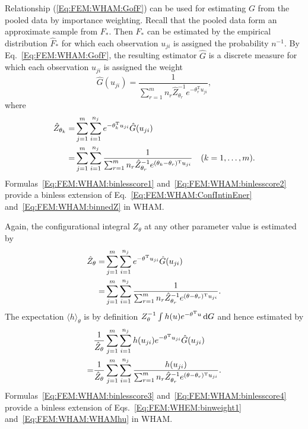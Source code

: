Relationship (\ref{Eq:FEM:WHAM:GofF}) can be used for estimating $G$ from the pooled data by importance weighting. Recall that the pooled data form an approximate sample from $F_\ast$. Then $F_\ast$ can be estimated by the empirical distribution $\hat{F}_\ast$ for which each observation $u_{ji}$ is assigned the probability $n^{-1}$. By Eq.~\ref{Eq:FEM:WHAM:GofF}, the resulting estimator $\hat{G}$ is a discrete measure for which each observation $u_{ji}$ is assigned the weight
\begin{equation}
    \hat{G}(u_{ji})=\frac{1}{\sum_{r=1}^m n_r\hat{Z}_{\theta_r}^{-1}e^{-\theta_r^\mathrm{T}u_{ji}}},
    \label{Eq:FEM:WHAM:binlesscore1}
\end{equation}
where
\begin{align}
   \hat{Z}_{\theta_k}=&\sum_{j=1}^m \sum_{i=1}^{n_j}e^{-\theta_k^{\mathrm{T}}u_{ji}}\hat{G}(u_{ji})\notag\\
                     =&\sum_{j=1}^m \sum_{i=1}^{n_j}\frac{1}{\sum_{r=1}^m n_r\hat{Z}_{\theta_r}^{-1}e^{(\theta_k-\theta_r)^{\mathrm{T}}u_{ji}}}\quad (k=1,\dots,m).
   \label{Eq:FEM:WHAM:binlesscore2}
\end{align}
Formulas~\ref{Eq:FEM:WHAM:binlesscore1} and~\ref{Eq:FEM:WHAM:binlesscore2} provide a binless extension of Eq.~\ref{Eq:FEM:WHAM:ConfIntinEner} and~\ref{Eq:FEM:WHAM:binnedZ} in WHAM.

Again, the configurational integral $Z_\theta$ at any other parameter value is estimated by
\begin{align}
    \hat{Z}_{\theta}=&\sum_{j=1}^m \sum_{i=1}^{n_j}e^{-\theta^{\mathrm{T}}u_{ji}}\hat{G}(u_{ji})\notag\\
    =&\sum_{j=1}^m \sum_{i=1}^{n_j}\frac{1}{\sum_{r=1}^m n_r\hat{Z}_{\theta_r}^{-1}e^{(\theta-\theta_r)^{\mathrm{T}}u_{ji}}}.
    \label{Eq:FEM:WHAM:binlesscore3}
\end{align}
The expectation $\langle h\rangle_\theta$ is by definition $Z_\theta^{-1}\int h(u)e^{-\theta^\mathrm{T}u}\mathop{}\!\mathrm{d} G$ and hence estimated by
\begin{align}
    &\frac{1}{\hat{Z}_\theta}\sum_{j=1}^m\sum_{i=1}^{n_j}h(u_{ji})e^{-\theta^\mathrm{T}u_{ji}}\hat{G}(u_{ji})\notag\\
    =&\frac{1}{\hat{Z}_\theta}\sum_{j=1}^m \sum_{i=1}^{n_j}\frac{h(u_{ji})}{\sum_{r=1}^m n_r\hat{Z}_{\theta_r}^{-1}e^{(\theta-\theta_r)^{\mathrm{T}}u_{ji}}}.
    \label{Eq:FEM:WHAM:binlesscore4}
\end{align}
Formulas~\ref{Eq:FEM:WHAM:binlesscore3} and~\ref{Eq:FEM:WHAM:binlesscore4} provide a binless extension of Eqs.~\ref{Eq:FEM:WHEM:binweight1} and~\ref{Eq:FEM:WHAM:WHAMhu} in WHAM.

